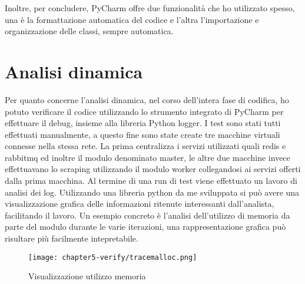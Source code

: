 Inoltre, per concludere, PyCharm offre due funzionalità che ho utilizzato spesso, una è la formattazione automatica del codice e l’altra l’importazione e organizzazione delle classi, sempre automatica.

\section{Analisi dinamica}

Per quanto concerne l’analisi dinamica, nel corso dell’intera fase di codifica, ho potuto verificare il codice utilizzando lo strumento integrato di PyCharm per effettuare il debug, insieme alla libreria Python logger. I test sono stati tutti effettuati manualmente, a questo fine sono state create tre macchine virtuali connesse nella stessa rete. La prima centralizza i servizi utilizzati quali redis e rabbitmq ed inoltre il modulo denominato master, le altre due macchine invece effettuavano lo scraping utilizzando il modulo worker collegandosi ai servizi offerti dalla prima macchina. \newline{}
Al termine di una run di test viene effettuato un lavoro di analisi dei log. Utilizzando una libreria python da me sviluppata si può avere una visualizzazione grafica delle informazioni ritenute interessanti dall'analista, facilitando il lavoro. Un esempio concreto è l'analisi dell'utilizzo di memoria da parte del modulo durante le varie iterazioni, una rappresentazione grafica può risultare più facilmente intepretabile.

\begin{figure}[!h] 
    \centering 
    \texttt{[image: chapter5-verify/tracemalloc.png]} 
    \caption{Visualizzazione utilizzo memoria}
    \label{fig:visualizzazione-utilizzo-memoria} 
\end{figure}




